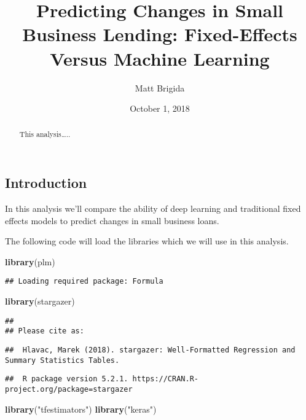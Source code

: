 \documentclass[]{article}
\title{Predicting Changes in Small Business Lending: Fixed-Effects Versus
Machine Learning}
\author{Matt Brigida}
\date{October 1, 2018}
\newenvironment{Shaded}{\begin{snugshade}}{\end{snugshade}}
\newcommand{\KeywordTok}[1]{\textcolor[rgb]{0.13,0.29,0.53}{\textbf{#1}}}
\newcommand{\NormalTok}[1]{#1}
\newcommand{\StringTok}[1]{\textcolor[rgb]{0.31,0.60,0.02}{#1}}
\begin{document}
\maketitle
\begin{abstract}
This analysis\ldots{}..
\end{abstract}

\hypertarget{introduction}{%
\subsection{Introduction}\label{introduction}}

In this analysis we'll compare the ability of deep learning and
traditional fixed effects models to predict changes in small business
loans.

The following code will load the libraries which we will use in this
analysis.

\begin{Shaded}
\begin{Highlighting}[]
\KeywordTok{library}\NormalTok{(plm)}
\end{Highlighting}
\end{Shaded}

\begin{verbatim}
## Loading required package: Formula
\end{verbatim}

\begin{Shaded}
\begin{Highlighting}[]
\KeywordTok{library}\NormalTok{(stargazer)}
\end{Highlighting}
\end{Shaded}

\begin{verbatim}
## 
## Please cite as:
\end{verbatim}

\begin{verbatim}
##  Hlavac, Marek (2018). stargazer: Well-Formatted Regression and Summary Statistics Tables.
\end{verbatim}

\begin{verbatim}
##  R package version 5.2.1. https://CRAN.R-project.org/package=stargazer
\end{verbatim}

\begin{Shaded}
\begin{Highlighting}[]
\KeywordTok{library}\NormalTok{(}\StringTok{"tfestimators"}\NormalTok{)}
\KeywordTok{library}\NormalTok{(}\StringTok{"keras"}\NormalTok{)}
\end{Highlighting}
\end{Shaded}
\end{document}
